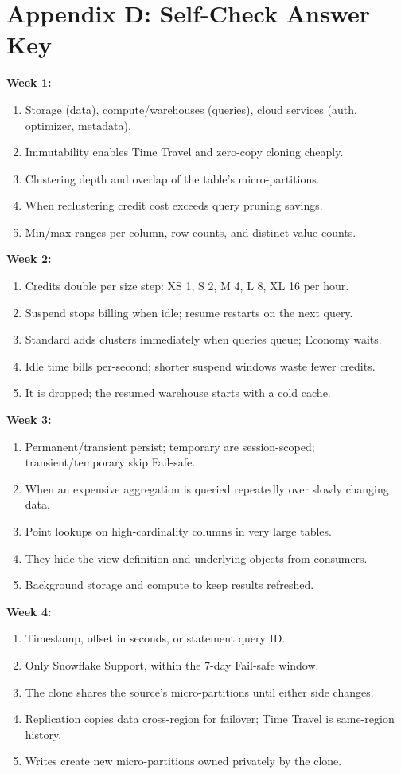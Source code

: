 \documentclass[11pt, a4paper]{article}
\begin{document}
\newpage
\section{Appendix D: Self-Check Answer Key}

\noindent\textbf{Week 1:}
\begin{enumerate}[nosep, leftmargin=6mm]
    \item Storage (data), compute/warehouses (queries), cloud services (auth, optimizer, metadata).
    \item Immutability enables Time Travel and zero-copy cloning cheaply.
    \item Clustering depth and overlap of the table's micro-partitions.
    \item When reclustering credit cost exceeds query pruning savings.
    \item Min/max ranges per column, row counts, and distinct-value counts.
\end{enumerate}
\noindent\textbf{Week 2:}
\begin{enumerate}[nosep, leftmargin=6mm]
    \item Credits double per size step: XS 1, S 2, M 4, L 8, XL 16 per hour.
    \item Suspend stops billing when idle; resume restarts on the next query.
    \item Standard adds clusters immediately when queries queue; Economy waits.
    \item Idle time bills per-second; shorter suspend windows waste fewer credits.
    \item It is dropped; the resumed warehouse starts with a cold cache.
\end{enumerate}
\noindent\textbf{Week 3:}
\begin{enumerate}[nosep, leftmargin=6mm]
    \item Permanent/transient persist; temporary are session-scoped; transient/temporary skip Fail-safe.
    \item When an expensive aggregation is queried repeatedly over slowly changing data.
    \item Point lookups on high-cardinality columns in very large tables.
    \item They hide the view definition and underlying objects from consumers.
    \item Background storage and compute to keep results refreshed.
\end{enumerate}
\noindent\textbf{Week 4:}
\begin{enumerate}[nosep, leftmargin=6mm]
    \item Timestamp, offset in seconds, or statement query ID.
    \item Only Snowflake Support, within the 7-day Fail-safe window.
    \item The clone shares the source's micro-partitions until either side changes.
    \item Replication copies data cross-region for failover; Time Travel is same-region history.
    \item Writes create new micro-partitions owned privately by the clone.
\end{enumerate}
\end{document}
